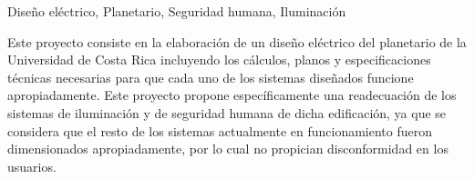 
\begin{resumen}{Diseño eléctrico, Planetario, Seguridad humana, Iluminación}

Este proyecto consiste en la elaboración de un diseño eléctrico del planetario de la Universidad de Costa Rica incluyendo los cálculos, planos y especificaciones técnicas necesarias para que cada uno de los sistemas diseñados funcione apropiadamente. Este proyecto propone específicamente una readecuación de los sistemas de iluminación y de seguridad humana de dicha edificación, ya que se considera que el resto de los sistemas actualmente en funcionamiento fueron dimensionados apropiadamente, por lo cual no propician disconformidad en los usuarios. 

\end{resumen}